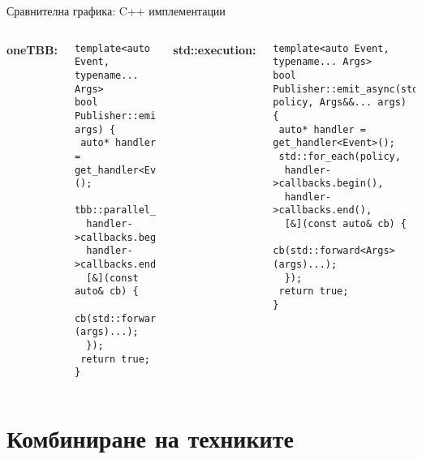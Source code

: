 \documentclass[aspectratio=169]{beamer}
\begin{document}
\begin{frame}[fragile]{Сравнителна графика: C++ имплементации}
\begin{columns}[T]

\textbf{\tiny oneTBB:}
\begin{lstlisting}[basicstyle=\ttfamily\tiny, numbers=none, frame=none, backgroundcolor=\color{gray!5}]
template<auto Event, typename... Args>
bool Publisher::emit_tbb_async(Args&&... args) {
 auto* handler = get_handler<Event>();
 tbb::parallel_for_each(
  handler->callbacks.begin(),
  handler->callbacks.end(),
  [&](const auto& cb) {
   cb(std::forward<Args>(args)...);
  });
 return true;
}
\end{lstlisting}
\textbf{\tiny std::execution:}
\begin{lstlisting}[basicstyle=\ttfamily\tiny, numbers=none, frame=none, backgroundcolor=\color{gray!5}]
template<auto Event, typename... Args>
bool Publisher::emit_async(std::execution::parallel_policy policy, Args&&... args) {
 auto* handler = get_handler<Event>();
 std::for_each(policy,
  handler->callbacks.begin(),
  handler->callbacks.end(),
  [&](const auto& cb) {
    cb(std::forward<Args>(args)...);
  });
 return true;
}
\end{lstlisting}
\end{columns}
\end{frame}

\section{Комбиниране на техниките}
\end{document}

